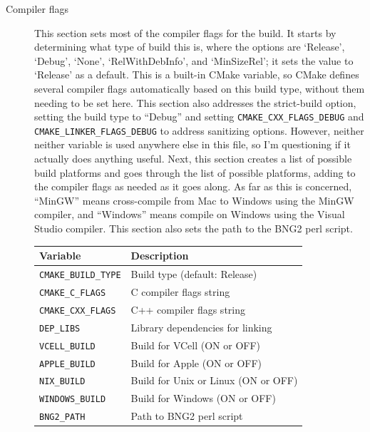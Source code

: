 \documentclass {scrbook}
\newcommand {\ttt} {\texttt}
\begin{document}
\begin{description}
\item[Compiler flags]
This section sets most of the compiler flags for the build. It starts by determining what type of build this is, where the options are `Release', `Debug', `None', `RelWithDebInfo', and `MinSizeRel'; it sets the value to `Release' as a default. This is a built-in CMake variable, so CMake defines several compiler flags automatically based on this build type, without them needing to be set here. This section also addresses the strict-build option, setting the build type to ``Debug'' and setting \ttt{CMAKE\_CXX\_FLAGS\_DEBUG} and \ttt{CMAKE\_LINKER\_FLAGS\_DEBUG} to address sanitizing options. However, neither neither variable is used anywhere else in this file, so I'm questioning if it actually does anything useful. Next, this section creates a list of possible build platforms and goes through the list of possible platforms, adding to the compiler flags as needed as it goes along. As far as this is concerned, ``MinGW'' means cross-compile from Mac to Windows using the MinGW compiler, and ``Windows'' means compile on Windows using the Visual Studio compiler. This section also sets the path to the BNG2 perl script.
\begin{longtable}[c]{ll}
Variable & Description\\
\hline
\ttt{CMAKE\_BUILD\_TYPE} & Build type (default: Release)\\
\ttt{CMAKE\_C\_FLAGS} & C compiler flags string\\
\ttt{CMAKE\_CXX\_FLAGS} & C++ compiler flags string\\
\ttt{DEP\_LIBS} & Library dependencies for linking\\
\ttt{VCELL\_BUILD} & Build for VCell (ON or OFF)\\
\ttt{APPLE\_BUILD} & Build for Apple (ON or OFF)\\
\ttt{NIX\_BUILD} & Build for Unix or Linux (ON or OFF)\\
\ttt{WINDOWS\_BUILD} & Build for Windows (ON or OFF)\\
\ttt{BNG2\_PATH} & Path to BNG2 perl script\\
\end{longtable}


\end{description}
\end{document}
